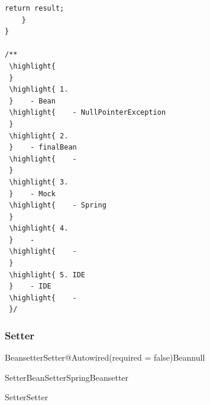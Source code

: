 \begin{lstlisting}[style=java]
        return result;
    }
}

/**
 \highlight{ 
 } 
 \highlight{ 1. 
 }    - Bean
 \highlight{    - NullPointerException
 } 
 \highlight{ 2. 
 }    - finalBean
 \highlight{    - 
 } 
 \highlight{ 3. 
 }    - Mock
 \highlight{    - Spring
 } 
 \highlight{ 4. 
 }    - 
 \highlight{    - 
 } 
 \highlight{ 5. IDE
 }    - IDE
 \highlight{    - 
 }/
\end{lstlisting}

\hypertarget{setter}{%
\subsubsection{Setter}\label{setter}}

BeansetterSetter\important{}@Autowired(required
= false)Beannull

\important{}SetterBeanSetterSpringBeansetter

SetterSetter


